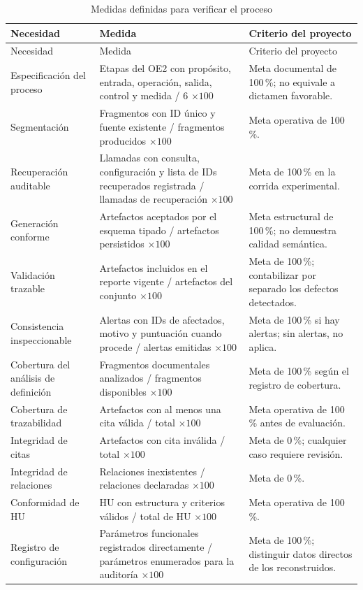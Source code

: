\begin{longtable}{p{4.0cm}p{5.8cm}p{4.8cm}}
  \caption{Medidas definidas para verificar el proceso}
  \label{tab:medidas-proceso}\\
  \toprule
  Necesidad & Medida & Criterio del proyecto \\
  \midrule
  \endfirsthead
  \toprule
  Necesidad & Medida & Criterio del proyecto \\
  \midrule
  \endhead
  Especificación del proceso & Etapas del OE2 con propósito, entrada, operación, salida, control y medida / 6 \(\times 100\) & Meta documental de 100\,\%; no equivale a dictamen favorable. \\
  Segmentación & Fragmentos con ID único y fuente existente / fragmentos producidos \(\times 100\) & Meta operativa de 100\,\%. \\
  Recuperación auditable & Llamadas con consulta, configuración y lista de IDs recuperados registrada / llamadas de recuperación \(\times 100\) & Meta de 100\,\% en la corrida experimental. \\
  Generación conforme & Artefactos aceptados por el esquema tipado / artefactos persistidos \(\times 100\) & Meta estructural de 100\,\%; no demuestra calidad semántica. \\
  Validación trazable & Artefactos incluidos en el reporte vigente / artefactos del conjunto \(\times 100\) & Meta de 100\,\%; contabilizar por separado los defectos detectados. \\
  Consistencia inspeccionable & Alertas con IDs de afectados, motivo y puntuación cuando procede / alertas emitidas \(\times 100\) & Meta de 100\,\% si hay alertas; sin alertas, no aplica. \\
  Cobertura del análisis de definición & Fragmentos documentales analizados / fragmentos disponibles \(\times 100\) & Meta de 100\,\% según el registro de cobertura. \\
  Cobertura de trazabilidad & Artefactos con al menos una cita válida / total \(\times 100\) & Meta operativa de 100\,\% antes de evaluación. \\
  Integridad de citas & Artefactos con cita inválida / total \(\times 100\) & Meta de 0\,\%; cualquier caso requiere revisión. \\
  Integridad de relaciones & Relaciones inexistentes / relaciones declaradas \(\times 100\) & Meta de 0\,\%. \\
  Conformidad de HU & HU con estructura y criterios válidos / total de HU \(\times 100\) & Meta operativa de 100\,\%. \\
  Registro de configuración & Parámetros funcionales registrados directamente / parámetros enumerados para la auditoría \(\times 100\) & Meta de 100\,\%; distinguir datos directos de los reconstruidos. \\
  \bottomrule
\end{longtable}

